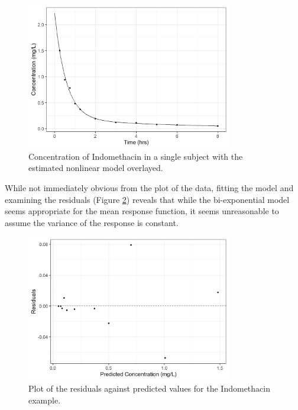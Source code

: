 \documentclass[
]{book}
\theoremstyle{plain}
\theoremstyle{mydefn}
\theoremstyle{myexmpl}
\theoremstyle{remark}
\begin{document}
\begin{figure}

{\centering \includegraphics[width=0.8\textwidth]{./Images/nlm-indomethacin-plot-1} 

}

\caption{Concentration of Indomethacin in a single subject with the estimated nonlinear model overlayed.}\label{fig:nlm-indomethacin-plot}
\end{figure}

While not immediately obvious from the plot of the data, fitting the model and examining the residuals (Figure \ref{fig:nlm-indometh-resids}) reveals that while the bi-exponential model seems appropriate for the mean response function, it seems unreasonable to assume the variance of the response is constant.

\begin{figure}

{\centering \includegraphics[width=0.8\textwidth]{./Images/nlm-indometh-resids-1} 

}

\caption{Plot of the residuals against predicted values for the Indomethacin example.}\label{fig:nlm-indometh-resids}
\end{figure}
\end{document}

